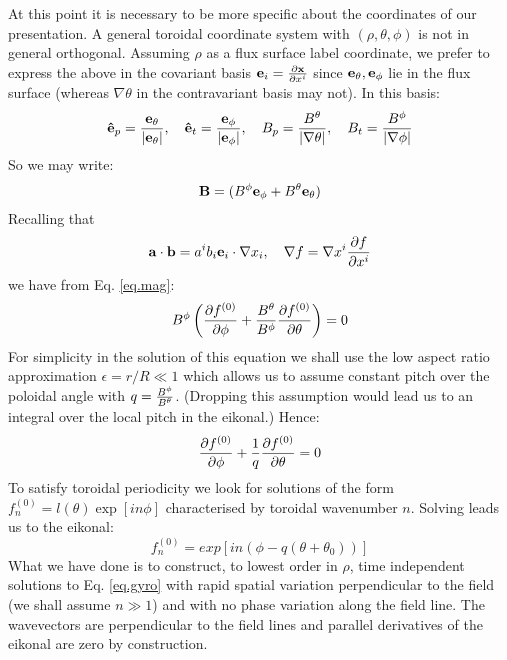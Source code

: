\documentclass[a4paper,11pt]{article}
\begin{document}
At this point it is necessary to be more specific about the coordinates of our presentation.  A general toroidal coordinate system with $(\rho,\theta,\phi)$ is not in general orthogonal.  Assuming $\rho$ as a flux surface label coordinate, we prefer to express the above in the covariant basis ${\bf e}_i={\partial {\bf x} \over \partial x^i}$ since ${\bf e}_\theta, {\bf e}_\phi$ lie in the flux surface (whereas $\nabla \theta$ in the contravariant basis may not). In this basis:
\begin{equation}
{\bf {\hat e}}_p = {{\bf e}_\theta \over |{\bf e}_\theta|},\quad {\bf {\hat e}}_t = {{\bf e}_\phi \over |{\bf e}_\phi|},\quad B_p = {B^\theta \over |\nabla \theta|},\quad B_t = {B^\phi \over |\nabla \phi|}
\end{equation}
So we may write:
 \begin{equation}
  {\bf B} = (B^\phi {\bf {e}}_\phi + B^\theta {\bf {e}}_\theta)
 \end{equation}
Recalling that 
\begin{equation}
 {\bf a} \cdot {\bf b} = a^i b_i {\bf e}_i \cdot \nabla x_i, \quad
\nabla f = \nabla x^i {\partial f \over \partial x^i}
\label{eq.bases}
\end{equation}
we have from Eq. \ref{eq.mag}:
\begin{equation}
B^\phi\left({\partial f^{(0)} \over \partial \phi} + {B^\theta \over B^\phi}{\partial f^{(0)} \over \partial \theta}\right) = 0
\end{equation}
For simplicity in the solution of this equation we shall use the low aspect ratio approximation $\epsilon = r/R \ll 1$ which allows us to assume constant pitch over the poloidal angle with $q = {B^\phi \over B^\theta}$.  (Dropping this assumption would lead us to an integral over the local pitch in the eikonal.)
Hence:
\begin{equation}
 {\partial f^{(0)} \over \partial \phi} + {1 \over q}{\partial f^{(0)} \over \partial \theta} = 0
\end{equation}
To satisfy toroidal periodicity we look for solutions of the form $f_n^{(0)} = l(\theta)\exp [in\phi]$ characterised by toroidal wavenumber $n$. Solving leads us to the eikonal:
\begin{equation}
 f_n^{(0)}=exp[in(\phi-q(\theta+\theta_0))]
\end{equation}
What we have done is to construct, to lowest order in $\rho$, time independent solutions to Eq. \ref{eq.gyro} with rapid spatial variation perpendicular to the field (we shall assume $n \gg 1$) and with no phase variation along the field line.  The wavevectors are perpendicular to the field lines and parallel derivatives of the eikonal are zero by construction.
\end{document}
